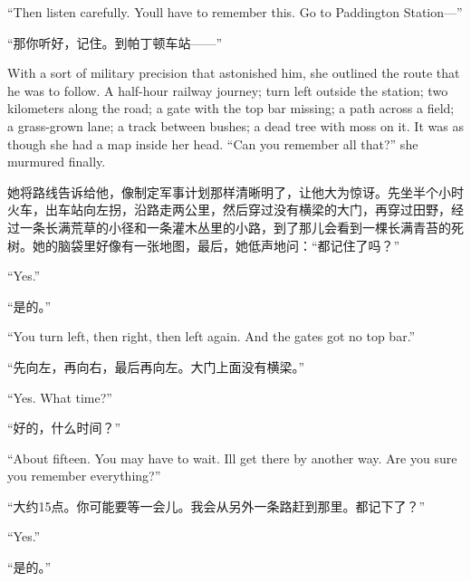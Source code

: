 \begin{paracol}{2}
``Then listen carefully. You\textquotesingle ll have to remember this. Go
to Paddington Station---''

\switchcolumn

``那你听好，记住。到帕丁顿车站——''

\switchcolumn*

With a sort of military precision that astonished him, she outlined the
route that he was to follow. A half-hour railway journey; turn left
outside the station; two kilometers along the road; a gate with the top
bar missing; a path across a field; a grass-grown lane; a track between
bushes; a dead tree with moss on it. It was as though she had a map
inside her head. ``Can you remember all that?'' she murmured finally.

\switchcolumn

她将路线告诉给他，像制定军事计划那样清晰明了，让他大为惊讶。先坐半个小时火车，出车站向左拐，沿路走两公里，然后穿过没有横梁的大门，再穿过田野，经过一条长满荒草的小径和一条灌木丛里的小路，到了那儿会看到一棵长满青苔的死树。她的脑袋里好像有一张地图，最后，她低声地问：``都记住了吗？''

\switchcolumn*

``Yes.''

\switchcolumn

``是的。''

\switchcolumn*

``You turn left, then right, then left again. And the
gate\textquotesingle s got no top bar.''

\switchcolumn

``先向左，再向右，最后再向左。大门上面没有横梁。''

\switchcolumn*

``Yes. What time?''

\switchcolumn

``好的，什么时间？''

\switchcolumn*

``About fifteen. You may have to wait. I\textquotesingle ll get there by
another way. Are you sure you remember everything?''

\switchcolumn

``大约15点。你可能要等一会儿。我会从另外一条路赶到那里。都记下了？''

\switchcolumn*

``Yes.''

\switchcolumn

``是的。''

\switchcolumn*


\end{paracol}
